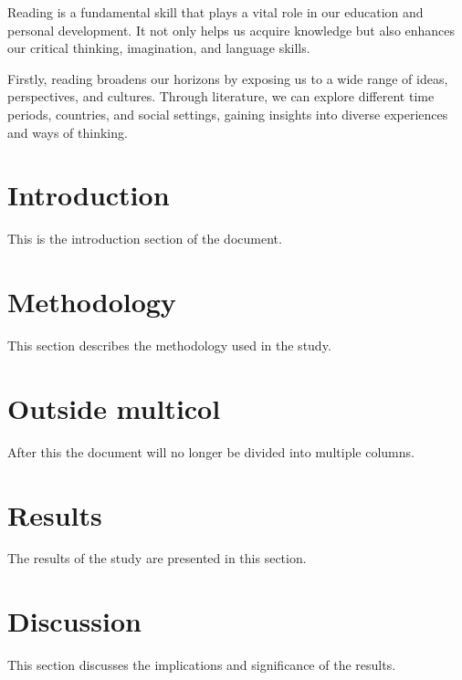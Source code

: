 \documentclass{article}
\begin{document}
\begin{multicols}{2}  
Reading is a fundamental skill that plays a vital role in our education and personal development. It not only helps us acquire knowledge but also enhances our critical thinking, imagination, and language skills.\par 
Firstly, reading broadens our horizons by exposing us to a wide range of ideas, perspectives, and cultures. Through literature, we can explore different time periods, countries, and social settings, gaining insights into diverse experiences and ways of thinking.
\section{Introduction}
This is the introduction section of the document.\section{Methodology}This section describes the methodology used in the study.
\end{multicols}
\section{Outside multicol}
After this the document will no longer be divided into multiple columns.
\section{Results}
The results of the study are presented in this section.\section{Discussion}This section discusses the implications and significance of the results.
\end{document}
